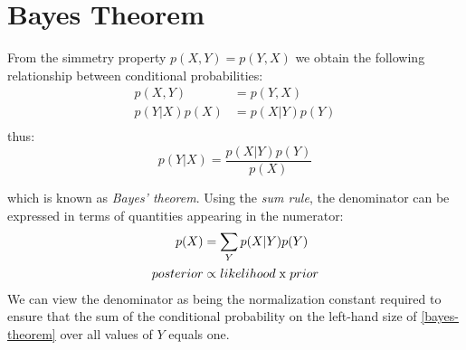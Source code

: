 \section{Bayes Theorem}
From the simmetry property $p(X,Y) = p(Y,X)$ we obtain the following relationship between conditional probabilities:
\begin{align*}
    p(X,Y) & = p(Y,X) \\
    p(Y|X)p(X) & = p(X|Y)p(Y) \\
\end{align*}
thus:
\begin{equation}
    p(Y|X) = \frac{p(X|Y)p(Y)}{p(X)} \label{bayes-theorem}
\end{equation}

which is known as \textit{Bayes' theorem}. Using the \textit{sum rule}, the denominator can be expressed in terms of quantities appearing in the numerator:
\begin{align*}
    p(X) & = \sum_Yp(X|Y)p(Y)  \\
    posterior & \propto likelihood\hspace{1mm}\mathrm{x}\hspace{1mm}prior
\end{align*}
We can view the denominator as being the normalization constant required to ensure that the sum of the conditional probability on the left-hand size of \ref{bayes-theorem} over all values of $Y$ equals one.
